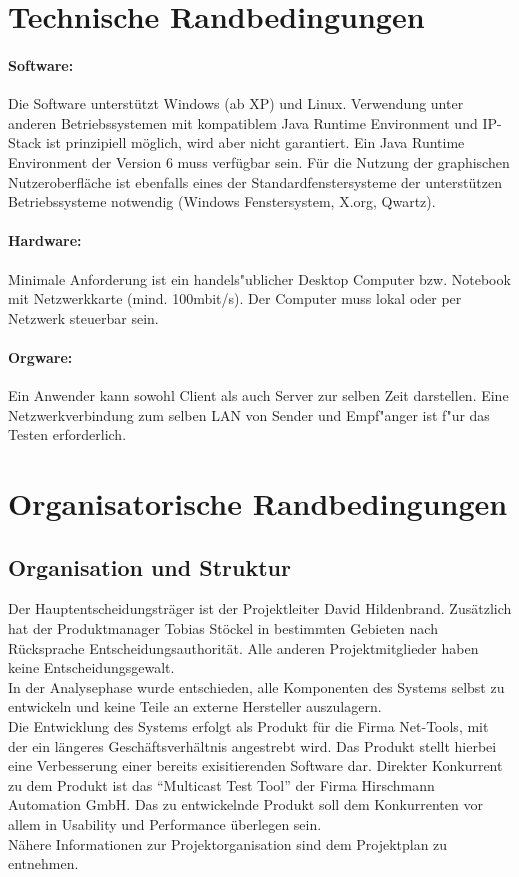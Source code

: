 \section{Technische Randbedingungen}
\label{sec:2:tr}

\paragraph{Software:} Die Software unterstützt Windows (ab XP) und Linux. 
Verwendung unter anderen Betriebssystemen mit kompatiblem Java
Runtime Environment und IP-Stack ist prinzipiell möglich, wird aber nicht
garantiert. Ein Java Runtime Environment der Version 6 muss verfügbar sein. Für
die Nutzung der graphischen Nutzeroberfläche ist ebenfalls eines der
Standardfenstersysteme der unterstützen Betriebssysteme notwendig (Windows
Fenstersystem, X.org, Qwartz).

\paragraph{Hardware:} Minimale Anforderung ist ein handels"ublicher Desktop
Computer bzw. Notebook mit Netzwerkkarte (mind. 100mbit/s). Der Computer muss
lokal oder per Netzwerk steuerbar sein.

\paragraph{Orgware:} Ein Anwender kann sowohl Client als auch Server zur selben
Zeit darstellen. Eine Netzwerkverbindung zum selben LAN von Sender und
Empf"anger ist f"ur das Testen erforderlich.

\section{Organisatorische Randbedingungen}
\label{sec:2:or}

\subsection{Organisation und Struktur}
Der Hauptentscheidungsträger ist der Projektleiter David Hildenbrand. 
Zusätzlich hat der Produktmanager Tobias Stöckel in bestimmten Gebieten nach Rücksprache 
Entscheidungsauthorität. Alle anderen Projektmitglieder haben keine Entscheidungsgewalt.
\\
In der Analysephase wurde entschieden, alle Komponenten des Systems selbst zu entwickeln und keine Teile an externe Hersteller auszulagern.
\\
Die Entwicklung des Systems erfolgt als Produkt für die Firma Net-Tools, mit der
ein längeres Geschäftsverhältnis angestrebt wird. Das Produkt stellt hierbei
eine Verbesserung einer bereits exisitierenden Software dar. Direkter Konkurrent
zu dem Produkt ist das "`Multicast Test Tool"' der Firma Hirschmann Automation GmbH. Das zu entwickelnde Produkt soll dem Konkurrenten vor allem in Usability und Performance überlegen sein.\\ Nähere Informationen zur Projektorganisation sind dem Projektplan zu entnehmen.

